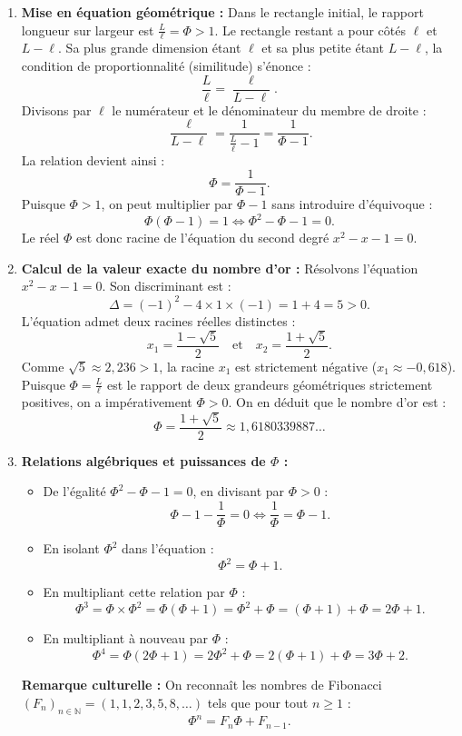 \documentclass[11pt,a4paper]{article}
\newcommand{\N}{\mathbb{N}}
\begin{document}
\begin{correctionbox}
\begin{enumerate}
    \item \textbf{Mise en équation géométrique :}
    Dans le rectangle initial, le rapport longueur sur largeur est $\frac{L}{\ell} = \Phi > 1$.
    Le rectangle restant a pour côtés $\ell$ et $L - \ell$.
    Sa plus grande dimension étant $\ell$ et sa plus petite étant $L - \ell$, la condition de proportionnalité (similitude) s'énonce :
    \[
    \frac{L}{\ell} = \frac{\ell}{L - \ell}.
    \]
    Divisons par $\ell$ le numérateur et le dénominateur du membre de droite :
    \[
    \frac{\ell}{L - \ell} = \frac{1}{\frac{L}{\ell} - 1} = \frac{1}{\Phi - 1}.
    \]
    La relation devient ainsi :
    \[
    \Phi = \frac{1}{\Phi - 1}.
    \]
    Puisque $\Phi > 1$, on peut multiplier par $\Phi - 1$ sans introduire d'équivoque :
    \[
    \Phi(\Phi - 1) = 1 \iff \Phi^2 - \Phi - 1 = 0.
    \]
    Le réel $\Phi$ est donc racine de l'équation du second degré $x^2 - x - 1 = 0$.

    \item \textbf{Calcul de la valeur exacte du nombre d'or :}
    Résolvons l'équation $x^2 - x - 1 = 0$.
    Son discriminant est :
    \[
    \Delta = (-1)^2 - 4 \times 1 \times (-1) = 1 + 4 = 5 > 0.
    \]
    L'équation admet deux racines réelles distinctes :
    \[
    x_1 = \frac{1 - \sqrt{5}}{2} \quad \text{et} \quad x_2 = \frac{1 + \sqrt{5}}{2}.
    \]
    Comme $\sqrt{5} \approx 2{,}236 > 1$, la racine $x_1$ est strictement négative ($x_1 \approx -0{,}618$).
    Puisque $\Phi = \frac{L}{\ell}$ est le rapport de deux grandeurs géométriques strictement positives, on a impérativement $\Phi > 0$.
    On en déduit que le nombre d'or est :
    \[
    \Phi = \frac{1 + \sqrt{5}}{2} \approx 1{,}6180339887\dots
    \]

    \item \textbf{Relations algébriques et puissances de $\Phi$ :}
    \begin{itemize}
        \item De l'égalité $\Phi^2 - \Phi - 1 = 0$, en divisant par $\Phi > 0$ :
        \[
        \Phi - 1 - \frac{1}{\Phi} = 0 \iff \frac{1}{\Phi} = \Phi - 1.
        \]
        \item En isolant $\Phi^2$ dans l'équation :
        \[
        \Phi^2 = \Phi + 1.
        \]
        \item En multipliant cette relation par $\Phi$ :
        \[
        \Phi^3 = \Phi \times \Phi^2 = \Phi(\Phi + 1) = \Phi^2 + \Phi = (\Phi + 1) + \Phi = 2\Phi + 1.
        \]
        \item En multipliant à nouveau par $\Phi$ :
        \[
        \Phi^4 = \Phi(2\Phi + 1) = 2\Phi^2 + \Phi = 2(\Phi + 1) + \Phi = 3\Phi + 2.
        \]
    \end{itemize}
    \textbf{Remarque culturelle :} On reconnaît les nombres de Fibonacci $(F_n)_{n \in \N} = (1, 1, 2, 3, 5, 8, \dots)$ tels que pour tout $n \ge 1$ :
    \[
    \Phi^n = F_n \Phi + F_{n-1}.
    \]
\end{enumerate}
\end{correctionbox}
\end{document}
